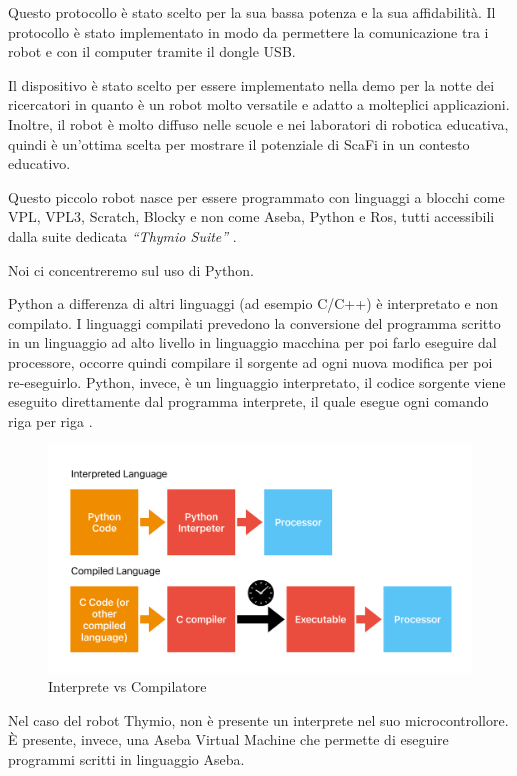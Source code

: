 \documentclass[12pt,a4paper,openright,twoside]{book}
\begin{document}
Questo protocollo è stato scelto per la sua bassa potenza e la sua affidabilità. Il protocollo è stato implementato in modo da permettere la comunicazione tra i robot e con il computer tramite il dongle USB.

Il dispositivo è stato scelto per essere implementato nella demo per la notte dei ricercatori in quanto è un robot molto versatile e adatto a molteplici applicazioni. Inoltre, il robot è molto diffuso nelle scuole e nei laboratori di robotica educativa, quindi è un'ottima scelta per mostrare il potenziale di ScaFi in un contesto educativo.

Questo piccolo robot nasce per essere programmato con linguaggi a blocchi come VPL, VPL3, Scratch, Blocky e non come Aseba, Python e Ros, tutti accessibili dalla suite dedicata \textit{``Thymio Suite''} \cite{mobsyaThymioDevice}.

Noi ci concentreremo sul uso di Python. 

Python a differenza di altri linguaggi (ad esempio C/C++) è interpretato e non compilato. I linguaggi compilati prevedono la conversione del programma scritto in un linguaggio ad alto livello in linguaggio macchina per poi farlo eseguire dal processore, occorre quindi compilare il sorgente ad ogni nuova modifica per poi re-eseguirlo. Python, invece, è un linguaggio interpretato, il codice sorgente viene eseguito direttamente dal programma interprete, il quale esegue ogni comando riga per riga \cite{robotadvanceUsingEducational}.

\begin{figure}
    \centering
    \includegraphics[width=.8\linewidth]{figures/interpreter-compiler.pdf}
    \caption{Interprete vs Compilatore}
    \label{fig:interpreter-vs-compiler}
\end{figure}

Nel caso del robot Thymio, non è presente un interprete nel suo microcontrollore. È presente, invece, una Aseba Virtual Machine che permette di eseguire programmi scritti in linguaggio Aseba. 
\end{document}
